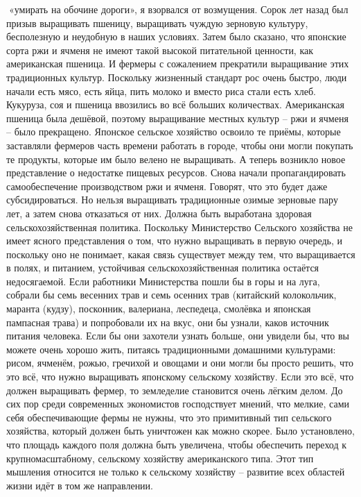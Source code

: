 \documentclass[a4paper]{book}
\begin{document}
«умирать на обочине дороги», я взорвался от возмущения.
Сорок лет назад был призыв выращивать пшеницу, выращивать чуждую зерновую
культуру, бесполезную и неудобную в наших условиях. Затем было сказано, что японские
сорта ржи и ячменя не имеют такой высокой питательной ценности, как американская
пшеница. И фермеры с сожалением прекратили выращивание этих традиционных культур.
Поскольку жизненный стандарт рос очень быстро, люди начали есть мясо, есть яйца, пить
молоко и вместо риса стали есть хлеб. Кукуруза, соя и пшеница ввозились во всё больших
количествах. Американская пшеница была дешёвой, поэтому выращивание местных
культур – ржи и ячменя – было прекращено. Японское сельское хозяйство освоило те
приёмы, которые заставляли фермеров часть времени работать в городе, чтобы они могли
покупать те продукты, которые им было велено не выращивать.
А теперь возникло новое представление о недостатке пищевых ресурсов. Снова начали
пропагандировать самообеспечение производством ржи и ячменя. Говорят, что это будет
даже субсидироваться. Но нельзя выращивать традиционные озимые зерновые пару лет, а
затем снова отказаться от них. Должна быть выработана здоровая сельскохозяйственная
политика. Поскольку Министерство Сельского хозяйства не имеет ясного представления о
том, что нужно выращивать в первую очередь, и поскольку оно не понимает, какая связь
существует между тем, что выращивается в полях, и питанием, устойчивая
сельскохозяйственная политика остаётся недосягаемой.
Если работники Министерства пошли бы в горы и на луга, собрали бы семь весенних
трав и семь осенних трав (китайский колокольчик, маранта (кудзу), посконник, валериана,
леспедеца, смолёвка и японская пампасная трава) и попробовали их на вкус, они бы узнали,
каков источник питания человека. Если бы они захотели узнать больше, они увидели бы, что
вы можете очень хорошо жить, питаясь традиционными домашними культурами: рисом,
ячменём, рожью, гречихой и овощами и они могли бы просто решить, что это всё, что нужно
выращивать японскому сельскому хозяйству. Если это всё, что должен выращивать фермер, то
земледелие становится очень лёгким делом.
До сих пор среди современных экономистов господствует мнений, что мелкие, сами
себя обеспечивающие фермы не нужны, что это примитивный тип сельского хозяйства,
который должен быть уничтожен как можно скорее. Было установлено, что площадь каждого
поля должна быть увеличена, чтобы обеспечить переход к крупномасштабному, сельскому
хозяйству американского типа. Этот тип мышления относится не только к сельскому
хозяйству – развитие всех областей жизни идёт в том же направлении.
\end{document}
